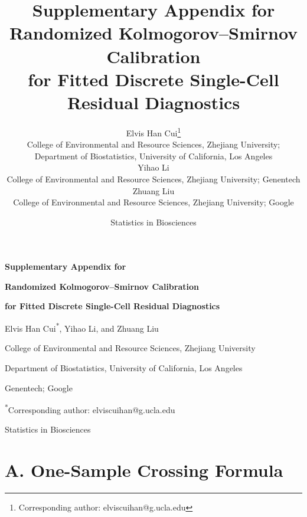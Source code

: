 \documentclass[12pt]{article}
\title{Supplementary Appendix for\\
Randomized Kolmogorov--Smirnov Calibration\\
for Fitted Discrete Single-Cell Residual Diagnostics}
\author{Elvis Han Cui\thanks{Corresponding author: elviscuihan@g.ucla.edu}\\
College of Environmental and Resource Sciences, Zhejiang University;\\
Department of Biostatistics, University of California, Los Angeles\\[0.6em]
Yihao Li\\
College of Environmental and Resource Sciences, Zhejiang University; Genentech\\[0.6em]
Zhuang Liu\\
College of Environmental and Resource Sciences, Zhejiang University; Google}
\date{Statistics in Biosciences}
\theoremstyle{remark}
\begin{document}
\begin{center}
{\LARGE\bfseries Supplementary Appendix for\par}
\vspace{0.5em}
{\Large\bfseries Randomized Kolmogorov--Smirnov Calibration\par}
{\Large\bfseries for Fitted Discrete Single-Cell Residual Diagnostics\par}
\vspace{1.0em}
{\large Elvis Han Cui\textsuperscript{*}, Yihao Li, and Zhuang Liu\par}
\vspace{0.4em}
{\small College of Environmental and Resource Sciences, Zhejiang University\par}
{\small Department of Biostatistics, University of California, Los Angeles\par}
{\small Genentech; Google\par}
\vspace{0.4em}
{\small \textsuperscript{*}Corresponding author: elviscuihan@g.ucla.edu\par}
\vspace{0.4em}
{\small Statistics in Biosciences\par}
\end{center}
\vspace{1em}

\section*{A. One-Sample Crossing Formula}
\end{document}
